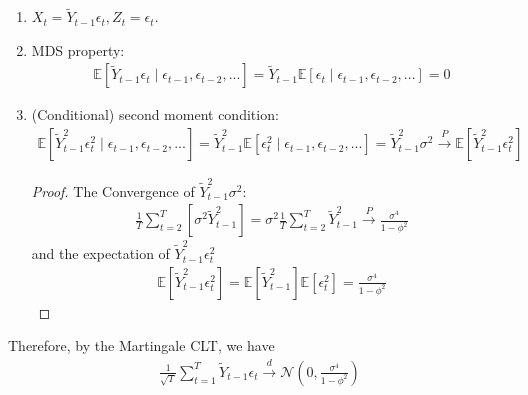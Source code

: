 \documentclass[11pt]{elegantbook}
\begin{document}
\begin{enumerate}[$\circ$]
    \item $X_t=\tilde{Y}_{t-1}\epsilon_t,Z_t=\epsilon_t$.
    \item MDS property:
    \begin{equation}
        \begin{aligned}
            \mathbb{E}\left[\tilde{Y}_{t-1}\epsilon_t\mid\epsilon_{t-1},\epsilon_{t-2},...\right]=\tilde{Y}_{t-1}\mathbb{E}\left[\epsilon_t\mid\epsilon_{t-1},\epsilon_{t-2},...\right]=0
        \end{aligned}
        \nonumber
    \end{equation}
    \item (Conditional) second moment condition:
    \begin{equation}
        \begin{aligned}
            \mathbb{E}\left[\tilde{Y}_{t-1}^2\epsilon_t^2\mid\epsilon_{t-1},\epsilon_{t-2},...\right]=\tilde{Y}_{t-1}^2\mathbb{E}\left[\epsilon_t^2\mid\epsilon_{t-1},\epsilon_{t-2},...\right]=\tilde{Y}_{t-1}^2\sigma^2\stackrel{P}{\longrightarrow} \mathbb{E}\left[\tilde{Y}_{t-1}^2\epsilon_t^2\right]
        \end{aligned}
        \nonumber
    \end{equation}
    \begin{proof}
        The Convergence of $\tilde{Y}_{t-1}^2\sigma^2$:
        \begin{equation}
            \begin{aligned}
                \frac{1}{T}\sum_{t=2}^T\left[\sigma^2\tilde{Y}_{t-1}^2\right]=\sigma^2\frac{1}{T}\sum_{t=2}^T\tilde{Y}_{t-1}^2 \stackrel{P}{\longrightarrow} \frac{\sigma^4}{1-\phi^2}
            \end{aligned}
            \nonumber
        \end{equation}
        and the expectation of $\tilde{Y}_{t-1}^2\epsilon_t^2$
        \begin{equation}
            \begin{aligned}
                \mathbb{E}\left[\tilde{Y}_{t-1}^2\epsilon_t^2\right]=\mathbb{E}[\tilde{Y}_{t-1}^2]\mathbb{E}[\epsilon_t^2]=\frac{\sigma^4}{1-\phi^2}
            \end{aligned}
            \nonumber
        \end{equation}
    \end{proof}
\end{enumerate}
Therefore, by the Martingale CLT, we have
\begin{equation}
    \begin{aligned}
        \frac{1}{\sqrt{T}}\sum_{t=1}^T \tilde{Y}_{t-1}\epsilon_t \stackrel{d}{\longrightarrow} \mathcal{N}\left(0,\frac{\sigma^4}{1-\phi^2}\right)
    \end{aligned}
    \nonumber
\end{equation}
\end{document}
